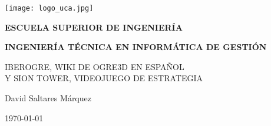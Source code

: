 

\begin{titlepage}

  \begin{center}

    \texttt{[image: logo\_uca.jpg]} \\
    
    \vspace{2.0cm}
    
    \LARGE{\textbf{ESCUELA SUPERIOR DE INGENIERÍA}} \\
    
    \vspace{1.0cm}
    
    \Large{\textbf{INGENIERÍA TÉCNICA EN INFORMÁTICA DE GESTIÓN}} \\
    
    \vspace{3.0cm}
    
    \Large{IBEROGRE, WIKI DE OGRE3D EN ESPAÑOL\\Y SION TOWER, VIDEOJUEGO DE ESTRATEGIA} \\
    
    \vspace{2.0cm}
    
    \Large{David Saltares Márquez} \\
  
    \vspace{0.5cm}

    \large{\today}
    
  \end{center}
\end{titlepage}
